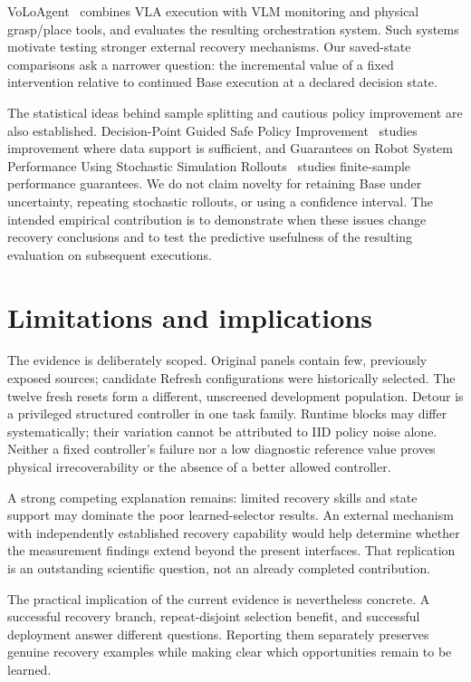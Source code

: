 VoLoAgent~\citep{chen2026volo} combines VLA execution with VLM monitoring and physical grasp/place tools, and evaluates the resulting orchestration system. Such systems motivate testing stronger external recovery mechanisms. Our saved-state comparisons ask a narrower question: the incremental value of a fixed intervention relative to continued Base execution at a declared decision state.


The statistical ideas behind sample splitting and cautious policy improvement are also established. Decision-Point Guided Safe Policy Improvement~\citep{sharma2025decision} studies improvement where data support is sufficient, and Guarantees on Robot System Performance Using Stochastic Simulation Rollouts~\citep{vincent2023guarantees} studies finite-sample performance guarantees. We do not claim novelty for retaining Base under uncertainty, repeating stochastic rollouts, or using a confidence interval. The intended empirical contribution is to demonstrate when these issues change recovery conclusions and to test the predictive usefulness of the resulting evaluation on subsequent executions.


\section{Limitations and implications}

The evidence is deliberately scoped. Original panels contain few, previously exposed sources; candidate Refresh configurations were historically selected. The twelve fresh resets form a different, unscreened development population. Detour is a privileged structured controller in one task family. Runtime blocks may differ systematically; their variation cannot be attributed to IID policy noise alone. Neither a fixed controller's failure nor a low diagnostic reference value proves physical irrecoverability or the absence of a better allowed controller.


A strong competing explanation remains: limited recovery skills and state support may dominate the poor learned-selector results. An external mechanism with independently established recovery capability would help determine whether the measurement findings extend beyond the present interfaces. That replication is an outstanding scientific question, not an already completed contribution.


The practical implication of the current evidence is nevertheless concrete. A successful recovery branch, repeat-disjoint selection benefit, and successful deployment answer different questions. Reporting them separately preserves genuine recovery examples while making clear which opportunities remain to be learned.


